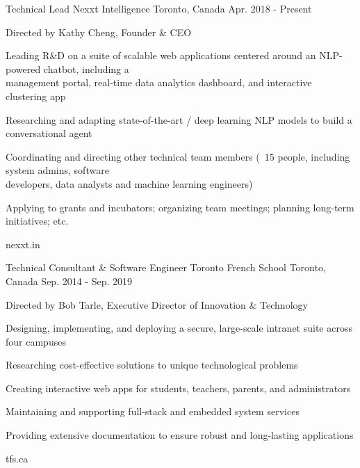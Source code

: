

\begin{cventries}

  \cventry
    {Technical Lead} %
    {Nexxt Intelligence} %
    {Toronto, Canada} %
    {Apr. 2018 - Present} %
    {
      \begin{cvitems} %
        \item{Directed by Kathy Cheng, Founder \& CEO}
        \item {Leading R\&D on a suite of scalable web applications centered around an NLP-powered chatbot, including a \\ management portal, real-time data analytics dashboard, and interactive clustering app}
        \item{Researching and adapting state-of-the-art / deep learning NLP models to build a conversational agent}
        \item{Coordinating and directing other technical team members (~15 people, including system admins, software \\ developers, data analysts and machine learning engineers)}
        \item{Applying to grants and incubators; organizing team meetings; planning long-term initiatives; etc.}
    \end{cvitems}
    }
    {nexxt.in}

  \cventry
    {Technical Consultant \& Software Engineer} %
    {Toronto French School} %
    {Toronto, Canada} %
    {Sep. 2014 - Sep. 2019} %
    {
      \begin{cvitems} %
        \item {Directed by Bob Tarle, Executive Director of Innovation \& Technology}
        \item{Designing, implementing, and deploying a secure, large-scale intranet suite across four campuses}
        \item{Researching cost-effective solutions to unique technological problems}
        \item{Creating interactive web apps for students, teachers, parents, and administrators}
        \item{Maintaining and supporting full-stack and embedded system services}
        \item{Providing extensive documentation to ensure robust and long-lasting applications}
      \end{cvitems}
    }
    {tfs.ca}

\end{cventries}
